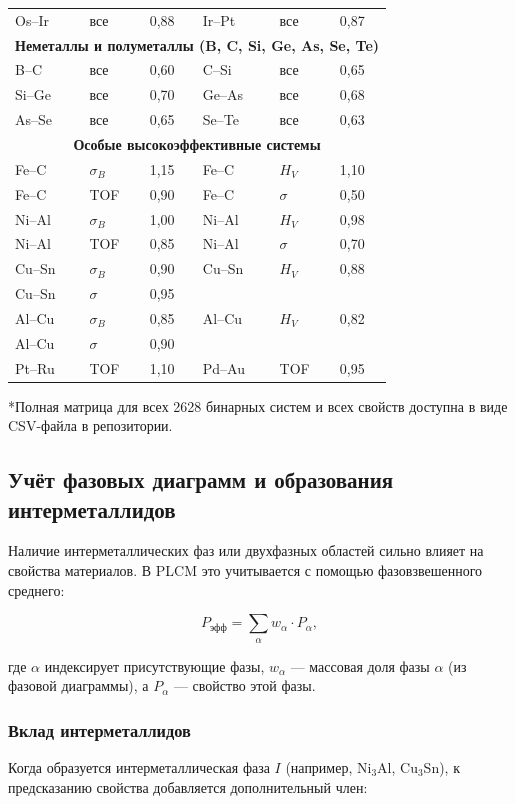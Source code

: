 \documentclass[12pt,a4paper]{article}
\begin{document}
\begin{longtable}{p{1.5cm}p{1.5cm}p{1.2cm}p{1.2cm}p{1.2cm}p{1.2cm}}
		Os–Ir & все & 0,88 & Ir–Pt & все & 0,87 \\
		\multicolumn{6}{c}{\textbf{Неметаллы и полуметаллы (B, C, Si, Ge, As, Se, Te)}} \\
		B–C  & все & 0,60 & C–Si  & все & 0,65 \\
		Si–Ge & все & 0,70 & Ge–As & все & 0,68 \\
		As–Se & все & 0,65 & Se–Te & все & 0,63 \\
		\multicolumn{6}{c}{\textbf{Особые высокоэффективные системы}} \\
		Fe–C  & \(\sigma_B\) & 1,15 & Fe–C  & \(H_V\) & 1,10 \\
		Fe–C  & TOF & 0,90 & Fe–C  & \(\sigma\) & 0,50 \\
		Ni–Al & \(\sigma_B\) & 1,00 & Ni–Al & \(H_V\) & 0,98 \\
		Ni–Al & TOF & 0,85 & Ni–Al & \(\sigma\) & 0,70 \\
		Cu–Sn & \(\sigma_B\) & 0,90 & Cu–Sn & \(H_V\) & 0,88 \\
		Cu–Sn & \(\sigma\) & 0,95 & & & \\
		Al–Cu & \(\sigma_B\) & 0,85 & Al–Cu & \(H_V\) & 0,82 \\
		Al–Cu & \(\sigma\) & 0,90 & & & \\
		Pt–Ru & TOF & 1,10 & Pd–Au & TOF & 0,95 \\
		\bottomrule
	\end{longtable}
	*Полная матрица для всех 2628 бинарных систем и всех свойств доступна в виде CSV-файла в репозитории.
	
	\subsection{Учёт фазовых диаграмм и образования интерметаллидов}
	\label{subsec:phase-diagrams}
	
	Наличие интерметаллических фаз или двухфазных областей сильно влияет на свойства материалов. В PLCM это учитывается с помощью фазовзвешенного среднего:
	
	\begin{equation}
		P_{\text{эфф}} = \sum_{\alpha} w_{\alpha} \cdot P_{\alpha},
		\label{eq:phase-weighted}
	\end{equation}
	
	где \(\alpha\) индексирует присутствующие фазы, \(w_{\alpha}\) — массовая доля фазы \(\alpha\) (из фазовой диаграммы), а \(P_{\alpha}\) — свойство этой фазы.
	
	\subsubsection{Вклад интерметаллидов}
	Когда образуется интерметаллическая фаза \(I\) (например, Ni\(_3\)Al, Cu\(_3\)Sn), к предсказанию свойства добавляется дополнительный член:
	
\end{document}
